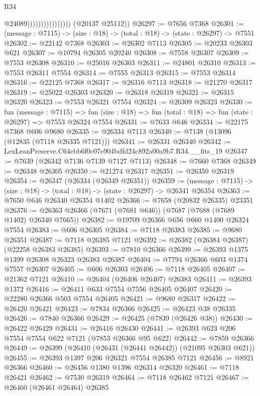 \begin{lexlean}{R34}
\begin{coremodule}
                                      @24089))))))))))))))))
      (@20137 @25112))
@26297 := @7656 @7368
@26301 := (message : @7115) -> (size : @18) -> (total : @18) -> (state : @26297) -> @7551
@26302 := @22142 @7368
@26303 := @26302 @7113
@26305 := @20233 @26303 @621
@26307 := @10794 @26305 @20240
@26308 := @7558 @26307
@26309 := @7553 @26308
@26310 := @25016 @26303
@26311 := @24801 @26310
@26313 := @7553 @26311 @7554
@26314 := @7555 @26313
@26315 := @7553 @26314
@26316 := @22125 @7368
@26317 := @26316 @7113
@26318 := @21270 @26317
@26319 := @25022 @26303
@26320 := @26318 @26319
@26321 := @26315 @26320
@26323 := @7553 @26321 @7554
@26324 := @26309 @26323
@26330 := fun (message : @7115) =>
  fun (size : @18) => fun (total : @18) => fun (state : @26297) => @7553 @26324 @7554
@26331 := @7633 @646
@26334 := @22175 @7368 @606 @9680
@26335 := @26334 @7113
@26340 := @7138 (@13096 (@12835 (@7118 @26335 @7121)))
@26341 := @26331 @26340
@26342 := LexLeanPreserve.C64ebb6f0c07e904bdfd24c892a00a9b7.R34.__fits_19
@26347 := @7639 (@26342 @7136 @7139 @7127 @7113)
@26348 := @7660 @7368
@26349 := @26348 @26305
@26350 := @21274 @26317
@26351 := @26350 @26319
@26354 := @26347 (@26334 (@26349 @26351))
@26359 := (message : @7115) -> (size : @18) -> (total : @18) -> (state : @26297) -> @26341 @26354
@26363 := @7650 @646 @26340 @26354 @1402
@26366 := @7658 (@20832 @26335) @23351
@26376 := @26363 @26366 (@7671 (@7681 @646)) (@7687 (@7688 (@7689 @1402) @26340 @7665))
@26382 := @19709 @26366 @656 @660 @1400 @26324 @7554
@26383 := @606 @26305
@26384 := @7118 @26383
@26385 := @9680 @26351
@26387 := @7118 @26385 @7121
@26392 := @26382 (@26384 @26387) (@22258 @26383 @26385)
@26393 := @7810 @26366
@26399 := @26393 @1375 @1399 @26308 @26323 @26383 @26387
@26404 := @7794 @26366 @603 @1374 @7557 @26307
@26405 := @606 @26303
@26406 := @7118 @26405
@26407 := @21362 @7121
@26410 := @26404 (@26406 @26407) @26383
@26411 := @26393 @1372
@26416 := @26411 @633 @7554 @7556 @26405 @26407
@26420 := @22280 @26366 @503 @7554 @26405
@26421 := @9680 @26317
@26422 := @26420 @26421
@26423 := @7834 @26366
@26425 := @26423 @38 @26335
@26426 := @7840 @26366
@26429 := @26425 (@7839 (@26426 @38))
@26430 := @26422 @26429
@26431 := @26416 @26430
@26441 := @26393 @623 @206 @7554 @7554 @622 @7121 (@7853 @26366 @95 @622)
@26442 := @7859 @26366
@26449 := @26399 (@26410 (@26431 (@26441 @26442)) (@21095 @26303 @621))
@26455 := @26393 @1397 @206 @26321 @7554 @26385 @7121
@26456 := @8921 @26366
@26460 := @26456 @1380 @1396 @26314 @26320
@26461 := @7118 @26421
@26462 := @7530 @26319
@26464 := @7118 @26462 @7121
@26467 := @26460 (@26461 @26464) @26385

\end{coremodule}
\end{lexlean}
